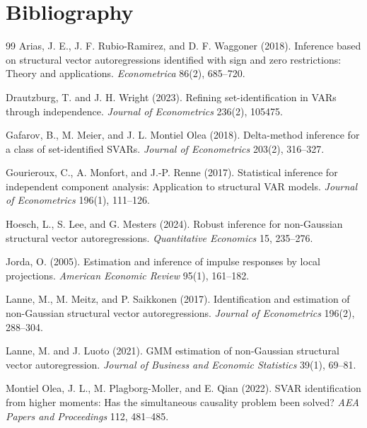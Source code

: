 \documentclass[11pt]{article}
\theoremstyle{definition}
\theoremstyle{plain}
\theoremstyle{remark}
\begin{document}
\section*{Bibliography}
\begin{thebibliography}{99}
Arias, J. E., J. F. Rubio-Ramirez, and D. F. Waggoner (2018).
Inference based on structural vector autoregressions identified with sign and zero restrictions: Theory and applications.
\emph{Econometrica} 86(2), 685--720.

Drautzburg, T. and J. H. Wright (2023).
Refining set-identification in VARs through independence.
\emph{Journal of Econometrics} 236(2), 105475.

Gafarov, B., M. Meier, and J. L. Montiel Olea (2018).
Delta-method inference for a class of set-identified SVARs.
\emph{Journal of Econometrics} 203(2), 316--327.

Gourieroux, C., A. Monfort, and J.-P. Renne (2017).
Statistical inference for independent component analysis: Application to structural VAR models.
\emph{Journal of Econometrics} 196(1), 111--126.

Hoesch, L., S. Lee, and G. Mesters (2024).
Robust inference for non-Gaussian structural vector autoregressions.
\emph{Quantitative Economics} 15, 235--276.

Jorda, O. (2005).
Estimation and inference of impulse responses by local projections.
\emph{American Economic Review} 95(1), 161--182.

Lanne, M., M. Meitz, and P. Saikkonen (2017).
Identification and estimation of non-Gaussian structural vector autoregressions.
\emph{Journal of Econometrics} 196(2), 288--304.

Lanne, M. and J. Luoto (2021).
GMM estimation of non-Gaussian structural vector autoregression.
\emph{Journal of Business and Economic Statistics} 39(1), 69--81.

Montiel Olea, J. L., M. Plagborg-Moller, and E. Qian (2022).
SVAR identification from higher moments: Has the simultaneous causality problem been solved?
\emph{AEA Papers and Proceedings} 112, 481--485.


\end{thebibliography}
\end{document}
